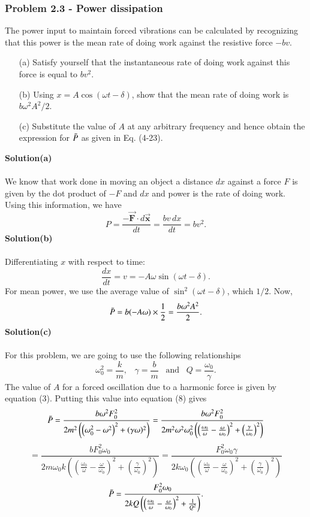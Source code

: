 \documentclass[12pt,a4paper]{article}
\begin{document}
\subsubsection*{Problem 2.3 - Power dissipation}
The power input to maintain forced vibrations can be calculated by recognizing that this power is the mean rate of doing work against the resistive force $-bv$.
\begin{enumerate}
    \item[(a)]Satisfy yourself that the instantaneous rate of doing work against this force is equal to $bv^2$.
    \item[(b)]Using $x=A\cos(\omega t-\delta)$, show that the mean rate of doing work is $b\omega^2A^2/2$.
    \item[(c)]Substitute the value of $A$ at any arbitrary frequency and hence obtain the expression for $\Bar{P}$ as given in Eq. (4-23).
\end{enumerate}
\textbf{Solution(a)}
\\
\\We know that work done in moving an object a distance $dx$ against a force $F$ is given by the dot product of $-F$ and $dx$ and power is the rate of doing work. Using this information, we have
\[P=\frac{-\boldsymbol{\Vec{F}}\cdot d\boldsymbol{\Vec{x}}}{dt}=\frac{bv\,dx}{dt}=bv^2.\]
\textbf{Solution(b)}
\\
\\Differentiating $x$ with respect to time:
\[\frac{dx}{dt}=v=-A\omega\sin(\omega t-\delta).\]
For mean power, we use the average value of $\sin^2(\omega t-\delta)$, which $1/2$. Now,
\begin{equation}
    \Bar{P}=b(-A\omega)\times\frac{1}{2}=\frac{b\omega^2A^2}{2}.
\end{equation}
\textbf{Solution(c)}
\\
\\For this problem, we are going to use the following relationships
\[\omega_0^2=\frac{k}{m},\,\,\,\,\,\gamma=\frac{b}{m}\,\,\,\,\,\text{and}\,\,\,\,\,Q=\frac{\omega_0}{\gamma}.\]
The value of $A$ for a forced oscillation due to a harmonic force is given by equation (3). Putting this value into equation (8) gives
\[\Bar{P}=\frac{b\omega^2F^2_0}{2m^2\left(\left(\omega_0^2-\omega^2\right)^2+(\gamma\omega)^2\right)}=\frac{b\omega^2F_0^2}{2m^2\omega^2\omega_0^2\left(\left(\frac{\omega_0}{\omega}-\frac{\omega}{\omega_0}\right)^2+\left(\frac{\gamma}{\omega_0}\right)^2\right)}\]
\[=\frac{bF_0^2\omega_0}{2m\omega_0k\left(\left(\frac{\omega_0}{\omega}-\frac{\omega}{\omega_0}\right)^2+\left(\frac{\gamma}{\omega_0}\right)^2\right)}=\frac{F_0^2\omega_0\gamma}{2k\omega_0\left(\left(\frac{\omega_0}{\omega}-\frac{\omega}{\omega_0}\right)^2+\left(\frac{\gamma}{\omega_0}\right)^2\right)}\]
\begin{equation}
    \Bar{P}=\frac{F_0^2\omega_0}{2kQ\left(\left(\frac{\omega_0}{\omega}-\frac{\omega}{\omega_0}\right)^2+\frac{1}{Q^2}\right)}.
\end{equation}
\end{document}
